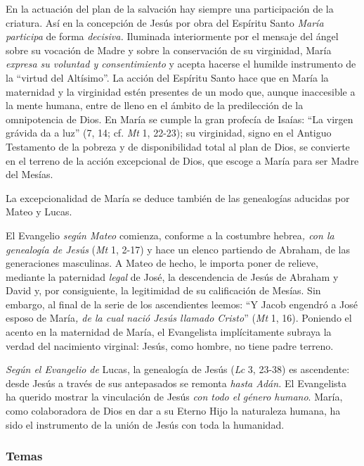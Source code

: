 \documentclass[]{article}
\begin{document}
En la actuación del plan de la salvación hay siempre una participación
de la criatura. Así en la concepción de Jesús por obra del Espíritu
Santo \emph{María participa} de forma \emph{decisiva.} Iluminada
interiormente por el mensaje del ángel sobre su vocación de Madre y
sobre la conservación de su virginidad, María \emph{expresa su voluntad
y consentimiento} y acepta hacerse el humilde instrumento de la ``virtud
del Altísimo''. La acción del Espíritu Santo hace que en María la
maternidad y la virginidad estén presentes de un modo que, aunque
inaccesible a la mente humana, entre de lleno en el ámbito de la
predilección de la omnipotencia de Dios. En María se cumple la gran
profecía de Isaías: ``La virgen grávida da a luz'' (7, 14; cf. \emph{Mt}
1, 22-23); su virginidad, signo en el Antiguo Testamento de la pobreza y
de disponibilidad total al plan de Dios, se convierte en el terreno de
la acción excepcional de Dios, que escoge a María para ser Madre del
Mesías.

La excepcionalidad de María se deduce también de las genealogías
aducidas por Mateo y Lucas.

El Evangelio \emph{según Mateo} comienza, conforme a la costumbre
hebrea\emph{, con la genealogía de Jesús} (\emph{Mt} 1, 2-17) y hace un
elenco partiendo de Abraham, de las generaciones masculinas. A Mateo de
hecho, le importa poner de relieve, mediante la paternidad \emph{legal}
de José, la descendencia de Jesús de Abraham y David y, por
consiguiente, la legitimidad de su calificación de Mesías. Sin embargo,
al final de la serie de los ascendientes leemos: ``Y Jacob engendró a
José esposo de María\emph{, de la cual nació Jesús llamado Cristo}''
(\emph{Mt} 1, 16). Poniendo el acento en la maternidad de María, el
Evangelista implícitamente subraya la verdad del nacimiento virginal:
Jesús, como hombre, no tiene padre terreno.

\emph{Según el Evangelio de} Lucas, la genealogía de Jesús (\emph{Lc} 3,
23-38) es ascendente: desde Jesús a través de sus antepasados se remonta
\emph{hasta Adán.} El Evangelista ha querido mostrar la vinculación de
Jesús \emph{con todo el género humano}. María, como colaboradora de Dios
en dar a su Eterno Hijo la naturaleza humana, ha sido el instrumento de
la unión de Jesús con toda la humanidad.

\subsubsection{Temas}\label{temas-4}
\end{document}
